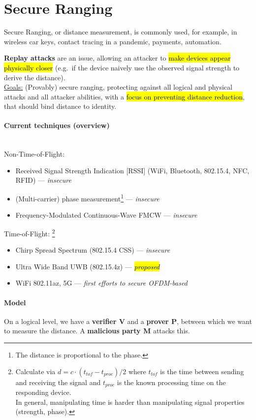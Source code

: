 \section{Secure Ranging}

Secure Ranging, or distance measurement, is commonly used, for example, in wireless car keys, contact tracing in a pandemic, payments, automation.

\textbf{Replay attacks} are an issue, allowing an attacker to \hl{make devices appear physically closer} (e.g.\ if the device naively use the observed signal strength to derive the distance).
\\
\underline{Goals:}
(Provably) secure ranging, protecting against all logical and physical attacks and all attacker abilities, with a \hl{focus on preventing distance reduction}, that should bind distance to identity.

\paragraph{Current techniques (overview)} \mbox{} \\
Non-Time-of-Flight:
\begin{itemize}
	\item Received Signal Strength Indication [RSSI] (WiFi, Bluetooth, 802.15.4, NFC, RFID) --- \textit{insecure}
	\item (Multi-carrier) phase measurement\footnote{The distance is proportional to the phase.}
	      --- \textit{insecure}
	\item Frequency-Modulated Continuous-Wave FMCW --- \textit{insecure}
\end{itemize}

Time-of-Flight:%
\footnote{
	Calculate via $d = c \cdot (t_{tof} - t_{proc}) / 2$
	where $t_{tof}$ is the time between sending and receiving the signal and $t_{proc}$ is the known processing time on the responding device. \\
	In general, manipulating time is harder than manipulating signal properties (strength, phase).}
\begin{itemize}
	\item Chirp Spread Spectrum (802.15.4 CSS) --- \textit{insecure}
	\item Ultra Wide Band UWB (802.15.4z) --- \hl{\textit{proposed}}
	\item WiFi 802.11az, 5G --- \textit{first efforts to secure OFDM-based}
\end{itemize}

\paragraph{Model}
On a logical level, we have a \textbf{verifier V} and a \textbf{prover P}, between which we want to measure the distance.
A \textbf{malicious party M} attacks this.

